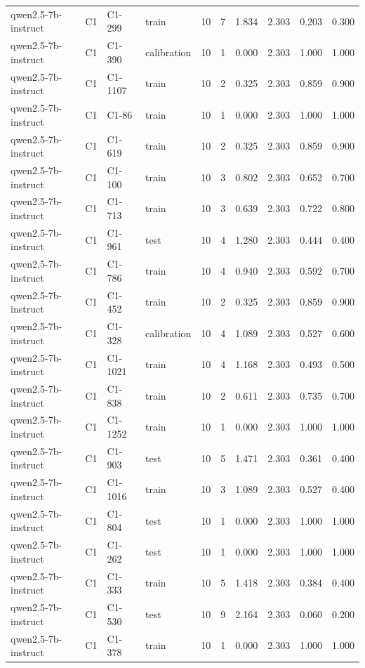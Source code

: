 \begin{table}
\begin{tabular}{llllrrrrrr}
qwen2.5-7b-instruct & C1 & C1-299 & train & 10 & 7 & 1.834 & 2.303 & 0.203 & 0.300 \\
qwen2.5-7b-instruct & C1 & C1-390 & calibration & 10 & 1 & 0.000 & 2.303 & 1.000 & 1.000 \\
qwen2.5-7b-instruct & C1 & C1-1107 & train & 10 & 2 & 0.325 & 2.303 & 0.859 & 0.900 \\
qwen2.5-7b-instruct & C1 & C1-86 & train & 10 & 1 & 0.000 & 2.303 & 1.000 & 1.000 \\
qwen2.5-7b-instruct & C1 & C1-619 & train & 10 & 2 & 0.325 & 2.303 & 0.859 & 0.900 \\
qwen2.5-7b-instruct & C1 & C1-100 & train & 10 & 3 & 0.802 & 2.303 & 0.652 & 0.700 \\
qwen2.5-7b-instruct & C1 & C1-713 & train & 10 & 3 & 0.639 & 2.303 & 0.722 & 0.800 \\
qwen2.5-7b-instruct & C1 & C1-961 & test & 10 & 4 & 1.280 & 2.303 & 0.444 & 0.400 \\
qwen2.5-7b-instruct & C1 & C1-786 & train & 10 & 4 & 0.940 & 2.303 & 0.592 & 0.700 \\
qwen2.5-7b-instruct & C1 & C1-452 & train & 10 & 2 & 0.325 & 2.303 & 0.859 & 0.900 \\
qwen2.5-7b-instruct & C1 & C1-328 & calibration & 10 & 4 & 1.089 & 2.303 & 0.527 & 0.600 \\
qwen2.5-7b-instruct & C1 & C1-1021 & train & 10 & 4 & 1.168 & 2.303 & 0.493 & 0.500 \\
qwen2.5-7b-instruct & C1 & C1-838 & train & 10 & 2 & 0.611 & 2.303 & 0.735 & 0.700 \\
qwen2.5-7b-instruct & C1 & C1-1252 & train & 10 & 1 & 0.000 & 2.303 & 1.000 & 1.000 \\
qwen2.5-7b-instruct & C1 & C1-903 & test & 10 & 5 & 1.471 & 2.303 & 0.361 & 0.400 \\
qwen2.5-7b-instruct & C1 & C1-1016 & train & 10 & 3 & 1.089 & 2.303 & 0.527 & 0.400 \\
qwen2.5-7b-instruct & C1 & C1-804 & test & 10 & 1 & 0.000 & 2.303 & 1.000 & 1.000 \\
qwen2.5-7b-instruct & C1 & C1-262 & test & 10 & 1 & 0.000 & 2.303 & 1.000 & 1.000 \\
qwen2.5-7b-instruct & C1 & C1-333 & train & 10 & 5 & 1.418 & 2.303 & 0.384 & 0.400 \\
qwen2.5-7b-instruct & C1 & C1-530 & test & 10 & 9 & 2.164 & 2.303 & 0.060 & 0.200 \\
qwen2.5-7b-instruct & C1 & C1-378 & train & 10 & 1 & 0.000 & 2.303 & 1.000 & 1.000 \\

\end{tabular}
\end{table}
